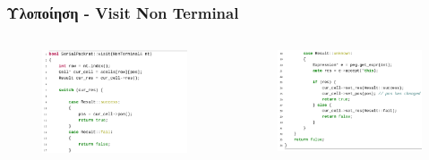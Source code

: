 \documentclass{beamer}
\begin{document}
\begin{frame}
  \frametitle{Υλοποίηση - Visit Non Terminal}

\begin{columns}

\begin{figure}[h]
    \centering
	\includegraphics[width=1.10\textwidth]{pics/nt_1}
\end{figure} 

\begin{figure}[h]
    \centering
	\includegraphics[width=1.10\textwidth]{pics/nt_2}
\end{figure} 

\end{columns}

\end{frame}
\end{document}
